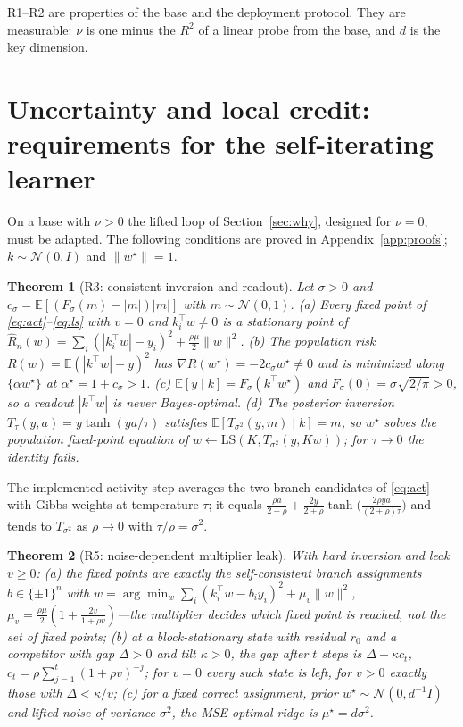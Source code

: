 \documentclass{article}
\newtheorem{theorem}{Theorem}
\theoremstyle{definition}
\theoremstyle{remark}
\newcommand{\Fsig}{F_{\sigma}}
\newcommand{\Ex}{\mathbb{E}}
\begin{document}
R1--R2 are properties of the base and the deployment protocol.
They are measurable: $\nu$ is one minus the $R^2$ of a linear probe from the base, and $d$ is the key dimension.

\section{Uncertainty and local credit: requirements for the self-iterating learner}
\label{sec:learner}

On a base with $\nu>0$ the lifted loop of Section~\ref{sec:why}, designed for $\nu=0$, must be adapted.
The following conditions are proved in Appendix~\ref{app:proofs}; $k\sim\mathcal N(0,I)$ and $\|w^\star\|=1$.

\begin{theorem}[R3: consistent inversion and readout]
\label{thm:l1}
Let $\sigma>0$ and $c_\sigma=\Ex[(\Fsig(m)-|m|)|m|]$ with $m\sim\mathcal N(0,1)$.
(a) Every fixed point of \eqref{eq:act}--\eqref{eq:ls} with $v=0$ and $k_i^\top w\neq0$ is a stationary point of $\hat R_n(w)=\sum_i(|k_i^\top w|-y_i)^2+\tfrac{\rho\mu}{2}\|w\|^2$.
(b) The population risk $R(w)=\Ex(|k^\top w|-y)^2$ has $\nabla R(w^\star)=-2c_\sigma w^\star\neq0$ and is minimized along $\{\alpha w^\star\}$ at $\alpha^\star=1+c_\sigma>1$.
(c) $\Ex[y\mid k]=\Fsig(k^\top w^\star)$ and $\Fsig(0)=\sigma\sqrt{2/\pi}>0$, so a readout $|k^\top w|$ is never Bayes-optimal.
(d) The posterior inversion $T_\tau(y,a)=y\tanh(ya/\tau)$ satisfies $\Ex[T_{\sigma^2}(y,m)\mid k]=m$, so $w^\star$ solves the population fixed-point equation of $w\leftarrow\mathrm{LS}(K,T_{\sigma^2}(y,Kw))$; for $\tau\to0$ the identity fails.
\end{theorem}

The implemented activity step averages the two branch candidates of \eqref{eq:act} with Gibbs weights at temperature $\tau$; it equals $\tfrac{\rho a}{2+\rho}+\tfrac{2y}{2+\rho}\tanh\!\big(\tfrac{2\rho ya}{(2+\rho)\tau}\big)$ and tends to $T_{\sigma^2}$ as $\rho\to0$ with $\tau/\rho=\sigma^2$.

\begin{theorem}[R5: noise-dependent multiplier leak]
\label{thm:l2}
With hard inversion and leak $v\geq0$:
(a) the fixed points are exactly the self-consistent branch assignments $b\in\{\pm1\}^n$ with $w=\arg\min_w\sum_i(k_i^\top w-b_iy_i)^2+\mu_v\|w\|^2$, $\mu_v=\tfrac{\rho\mu}{2}(1+\tfrac{2v}{1+\rho v})$---the multiplier decides which fixed point is reached, not the set of fixed points;
(b) at a block-stationary state with residual $r_0$ and a competitor with gap $\Delta>0$ and tilt $\kappa>0$, the gap after $t$ steps is $\Delta-\kappa c_t$, $c_t=\rho\sum_{j=1}^t(1+\rho v)^{-j}$; for $v=0$ every such state is left, for $v>0$ exactly those with $\Delta<\kappa/v$;
(c) for a fixed correct assignment, prior $w^\star\sim\mathcal N(0,d^{-1}I)$ and lifted noise of variance $\sigma^2$, the MSE-optimal ridge is $\mu^\star=d\sigma^2$.
\end{theorem}
\end{document}

